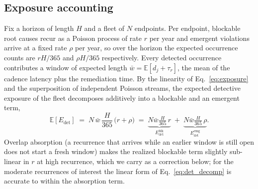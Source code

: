 \documentclass[journal]{IEEEtran}
\begin{document}
\subsection{Exposure accounting}
Fix a horizon of length $H$ and a fleet of $N$ endpoints. Per endpoint, blockable root causes
recur as a Poisson process of rate $r$ per year and emergent violations arrive at a fixed rate
$\rho$ per year, so over the horizon the expected occurrence counts are $r H / 365$ and
$\rho H / 365$ respectively. Every detected occurrence contributes a window of expected length
$\bar w = \mathbb{E}[d_j + \tau_r]$, the mean of the cadence latency plus the remediation time. By
the linearity of Eq.~\eqref{eq:exposure} and the superposition of independent Poisson streams, the
expected detective exposure of the fleet decomposes additively into a blockable and an emergent
term,
\begin{equation}
\mathbb{E}\!\left[E_{\text{det}}\right]
\;=\; N \,\bar w\, \frac{H}{365}\,\big(r + \rho\big)
\;=\; \underbrace{N \bar w \tfrac{H}{365}\, r}_{E^{\text{blk}}_{\text{det}}}
\;+\;\underbrace{N \bar w \tfrac{H}{365}\, \rho}_{E^{\text{emg}}_{\text{det}}}.
\label{eq:det_decomp}
\end{equation}
Overlap absorption (a recurrence that arrives while an earlier window is still open does not start
a fresh window) makes the realized blockable term slightly sub-linear in $r$ at high recurrence,
which we carry as a correction below; for the moderate recurrences of interest the linear form of
Eq.~\eqref{eq:det_decomp} is accurate to within the absorption term.
\end{document}
